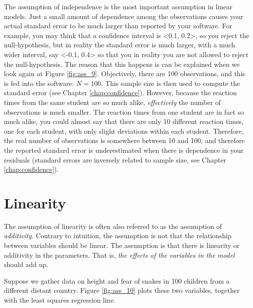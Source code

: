 \documentclass[]{report}\usepackage[]{graphicx}\usepackage[]{color}
\begin{document}
The assumption of independence is the most important assumption in linear models. Just a small amount of dependence among the observations causes your actual standard error to be much larger than reported by your software. For example, you may think that a confidence interval is <0.1, 0.2>, so you reject the null-hypothesis, but in reality the standard error is much larger, with a much wider interval, say <-0.1, 0.4> so that you in reality you are not allowed to reject the null-hypothesis. The reason that this happens is can be explained when we look again at Figure \ref{fig:ass_9}. Objectively, there are 100 observations, and this is fed into the software: $N=100$. This sample size is then used to compute the standard error (see Chapter \ref{chap:confidence}). However, because the reaction times from the same student are so much alike, \textit{effectively} the number of observations is much smaller. The reaction times from one student are in fact so much alike, you could almost say that there are only 10 different reaction times, one for each student, with only slight deviations within each student. Therefore, the real number of observations is somewhere between 10 and 100, and therefore the reported standard error is underestimated when there is dependence in your residuals (standard errors are inversely related to sample size, see Chapter \ref{chap:confidence}). 



\section{Linearity}

The assumption of linearity is often also referred to as the assumption of \textit{additivity}. Contrary to intuition, the assumption is not that the relationship between variables should be linear. The assumption is that there is linearity or additivity in the parameters. That is, \textit{the effects of the variables in the model} should add up. 

Suppose we gather data on height and fear of snakes in 100 children from a different distant country. Figure \ref{fig:ass_10} plots these two variables, together with the least squares regression line.
\end{document}
